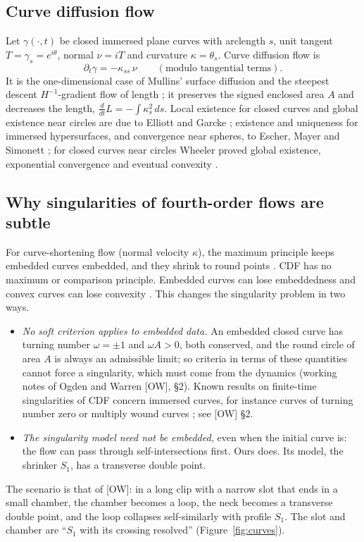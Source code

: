 \documentclass[11pt]{amsart}
\theoremstyle{definition}
\theoremstyle{remark}
\newcommand{\dref}[1]{[\textsf{#1}]}
\begin{document}
\subsection{Curve diffusion flow}
Let $\gamma(\cdot,t)$ be closed immersed plane curves with arclength $s$, unit tangent $T=\gamma_s=e^{i\theta}$, normal $\nu=iT$ and curvature $\kappa=\theta_s$. Curve diffusion flow is
\begin{equation}\label{eq:cdf}
\partial_t\gamma=-\kappa_{ss}\,\nu\qquad(\text{modulo tangential terms}).
\end{equation}
It is the one-dimensional case of Mullins' surface diffusion \cite{Mullins1957} and the steepest descent $H^{-1}$-gradient flow of length \cite{Wheeler2013}; it preserves the signed enclosed area $A$ and decreases the length, $\frac{d}{dt}L=-\int\kappa_s^2\,ds$. Local existence for closed curves and global existence near circles are due to Elliott and Garcke \cite{ElliottGarcke1997}; existence and uniqueness for immersed hypersurfaces, and convergence near spheres, to Escher, Mayer and Simonett \cite{EscherMayerSimonett1998}; for closed curves near circles Wheeler proved global existence, exponential convergence and eventual convexity \cite{Wheeler2013}.

\subsection{Why singularities of fourth-order flows are subtle}
For curve-shortening flow (normal velocity $\kappa$), the maximum principle keeps embedded curves embedded, and they shrink to round points \cite{Grayson1987}. CDF has no maximum or comparison principle. Embedded curves can lose embeddedness and convex curves can lose convexity \cite{GigaIto1998,GigaIto1999,MayerSimonett2000,Blatt2010}. This changes the singularity problem in two ways.
\begin{itemize}[leftmargin=*,itemsep=1pt]
\item \emph{No soft criterion applies to embedded data.} An embedded closed curve has turning number $\omega=\pm1$ and $\omega A>0$, both conserved, and the round circle of area $A$ is always an admissible limit; so criteria in terms of these quantities cannot force a singularity, which must come from the dynamics (working notes of Ogden and Warren \dref{OW}, \S2). Known results on finite-time singularities of CDF concern immersed curves, for instance curves of turning number zero or multiply wound curves \cite{Chou2003,EscherIto2005,EGMWW2015}; see \dref{OW} \S2.
\item \emph{The singularity model need not be embedded,} even when the initial curve is: the flow can pass through self-intersections first. Ours does. Its model, the shrinker $S_1$, has a transverse double point.
\end{itemize}
The scenario is that of \dref{OW}: in a long clip with a narrow slot that ends in a small chamber, the chamber becomes a loop, the neck becomes a transverse double point, and the loop collapses self-similarly with profile $S_1$. The slot and chamber are ``$S_1$ with its crossing resolved'' (Figure~\ref{fig:curves}).
\end{document}
